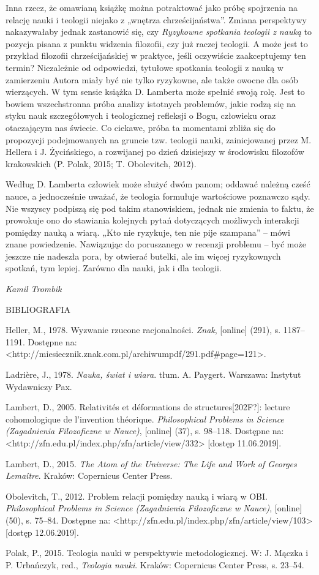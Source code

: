 \documentclass[a4paper]{article}
\begin{document}
Inna rzecz, że omawianą książkę można potraktować jako próbę spojrzenia na relację nauki i teologii niejako z „wnętrza
chrześcijaństwa”. Zmiana perspektywy nakazywałaby jednak zastanowić się, czy \textit{Ryzykowne spotkania teologii z
nauką} to pozycja pisana z punktu widzenia filozofii, czy już raczej teologii. A może jest to przykład filozofii
chrześcijańskiej w praktyce, jeśli oczywiście zaakceptujemy ten termin? Niezależnie od odpowiedzi, tytułowe spotkania
teologii z nauką w zamierzeniu Autora miały być nie tylko ryzykowne, ale także owocne dla osób wierzących. W tym sensie
książka D. Lamberta może spełnić swoją rolę. Jest to bowiem wszechstronna próba analizy istotnych problemów, jakie
rodzą się na styku nauk szczegółowych i teologicznej refleksji o Bogu, człowieku oraz otaczającym nas świecie. Co
ciekawe, próba ta momentami zbliża się do propozycji podejmowanych na gruncie tzw. teologii nauki, zainicjowanej przez
M. Hellera i J. Życińskiego, a rozwijanej po dzień dzisiejszy w środowisku filozofów krakowskich
\label{ref:RNDXIf9jvSSc3}(P. Polak, 2015; T. Obolevitch, 2012). 

Według D. Lamberta człowiek może służyć dwóm panom; oddawać należną cześć nauce, a jednocześnie uważać, że teologia
formułuje wartościowe poznawczo sądy. Nie wszyscy podpiszą się pod takim stanowiskiem, jednak nie zmienia to faktu, że
prowokuje ono do stawiania kolejnych pytań dotyczących możliwych interakcji pomiędzy nauką a wiarą. „Kto nie ryzykuje,
ten nie pije szampana” – mówi znane powiedzenie. Nawiązując do poruszanego w recenzji problemu – być może jeszcze nie
nadeszła pora, by otwierać butelki, ale im więcej ryzykownych spotkań, tym lepiej. Zarówno dla nauki, jak i dla
teologii. 

{\raggedleft\itshape
Kamil Trombik
\par}

BIBLIOGRAFIA

Heller, M., 1978. Wyzwanie rzucone racjonalności. \textit{Znak}, [online] (291), s. 1187–1191. Dostępne na:
{\textless}http://miesiecznik.znak.com.pl/archiwumpdf/291.pdf\#page=121{\textgreater}.

Ladrière, J., 1978. \textit{Nauka, świat i wiara}. tłum. A. Paygert. Warszawa: Instytut Wydawniczy Pax.

Lambert, D., 2005. Relativités et déformations de structures[202F?]: lecture cohomologique de l’invention théorique.
\textit{Philosophical Problems in Science (Zagadnienia Filozoficzne w Nauce)}, [online] (37), s. 98–118. Dostępne na:
{\textless}http://zfn.edu.pl/index.php/zfn/article/view/332{\textgreater} [dostęp 11.06.2019].

Lambert, D., 2015. \textit{The Atom of the Universe: The Life and Work of Georges Lemaître}. Kraków: Copernicus Center
Press.

Obolevitch, T., 2012. Problem relacji pomiędzy nauką i wiarą w OBI. \textit{Philosophical Problems in Science
(Zagadnienia Filozoficzne w Nauce)}, [online] (50), s. 75–84. Dostępne na:
{\textless}http://zfn.edu.pl/index.php/zfn/article/view/103{\textgreater} [dostęp 12.06.2019].

Polak, P., 2015. Teologia nauki w perspektywie metodologicznej. W: J. Mączka i P. Urbańczyk, red., \textit{Teologia
nauki}. Kraków: Copernicus Center Press, s. 23–54.
\end{document}
